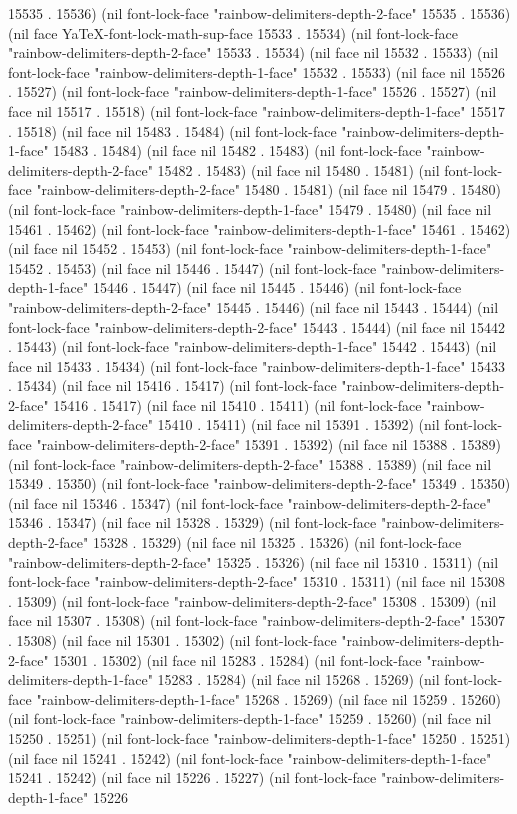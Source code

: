15535 . 15536) (nil font-lock-face "rainbow-delimiters-depth-2-face" 15535 . 15536) (nil face YaTeX-font-lock-math-sup-face 15533 . 15534) (nil font-lock-face "rainbow-delimiters-depth-2-face" 15533 . 15534) (nil face nil 15532 . 15533) (nil font-lock-face "rainbow-delimiters-depth-1-face" 15532 . 15533) (nil face nil 15526 . 15527) (nil font-lock-face "rainbow-delimiters-depth-1-face" 15526 . 15527) (nil face nil 15517 . 15518) (nil font-lock-face "rainbow-delimiters-depth-1-face" 15517 . 15518) (nil face nil 15483 . 15484) (nil font-lock-face "rainbow-delimiters-depth-1-face" 15483 . 15484) (nil face nil 15482 . 15483) (nil font-lock-face "rainbow-delimiters-depth-2-face" 15482 . 15483) (nil face nil 15480 . 15481) (nil font-lock-face "rainbow-delimiters-depth-2-face" 15480 . 15481) (nil face nil 15479 . 15480) (nil font-lock-face "rainbow-delimiters-depth-1-face" 15479 . 15480) (nil face nil 15461 . 15462) (nil font-lock-face "rainbow-delimiters-depth-1-face" 15461 . 15462) (nil face nil 15452 . 15453) (nil font-lock-face "rainbow-delimiters-depth-1-face" 15452 . 15453) (nil face nil 15446 . 15447) (nil font-lock-face "rainbow-delimiters-depth-1-face" 15446 . 15447) (nil face nil 15445 . 15446) (nil font-lock-face "rainbow-delimiters-depth-2-face" 15445 . 15446) (nil face nil 15443 . 15444) (nil font-lock-face "rainbow-delimiters-depth-2-face" 15443 . 15444) (nil face nil 15442 . 15443) (nil font-lock-face "rainbow-delimiters-depth-1-face" 15442 . 15443) (nil face nil 15433 . 15434) (nil font-lock-face "rainbow-delimiters-depth-1-face" 15433 . 15434) (nil face nil 15416 . 15417) (nil font-lock-face "rainbow-delimiters-depth-2-face" 15416 . 15417) (nil face nil 15410 . 15411) (nil font-lock-face "rainbow-delimiters-depth-2-face" 15410 . 15411) (nil face nil 15391 . 15392) (nil font-lock-face "rainbow-delimiters-depth-2-face" 15391 . 15392) (nil face nil 15388 . 15389) (nil font-lock-face "rainbow-delimiters-depth-2-face" 15388 . 15389) (nil face nil 15349 . 15350) (nil font-lock-face "rainbow-delimiters-depth-2-face" 15349 . 15350) (nil face nil 15346 . 15347) (nil font-lock-face "rainbow-delimiters-depth-2-face" 15346 . 15347) (nil face nil 15328 . 15329) (nil font-lock-face "rainbow-delimiters-depth-2-face" 15328 . 15329) (nil face nil 15325 . 15326) (nil font-lock-face "rainbow-delimiters-depth-2-face" 15325 . 15326) (nil face nil 15310 . 15311) (nil font-lock-face "rainbow-delimiters-depth-2-face" 15310 . 15311) (nil face nil 15308 . 15309) (nil font-lock-face "rainbow-delimiters-depth-2-face" 15308 . 15309) (nil face nil 15307 . 15308) (nil font-lock-face "rainbow-delimiters-depth-2-face" 15307 . 15308) (nil face nil 15301 . 15302) (nil font-lock-face "rainbow-delimiters-depth-2-face" 15301 . 15302) (nil face nil 15283 . 15284) (nil font-lock-face "rainbow-delimiters-depth-1-face" 15283 . 15284) (nil face nil 15268 . 15269) (nil font-lock-face "rainbow-delimiters-depth-1-face" 15268 . 15269) (nil face nil 15259 . 15260) (nil font-lock-face "rainbow-delimiters-depth-1-face" 15259 . 15260) (nil face nil 15250 . 15251) (nil font-lock-face "rainbow-delimiters-depth-1-face" 15250 . 15251) (nil face nil 15241 . 15242) (nil font-lock-face "rainbow-delimiters-depth-1-face" 15241 . 15242) (nil face nil 15226 . 15227) (nil font-lock-face "rainbow-delimiters-depth-1-face" 15226 
